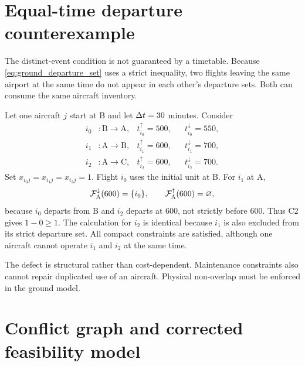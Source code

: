 \section{Equal-time departure counterexample}
\label{sec:ground_counterexample}

The distinct-event condition is not guaranteed by a timetable. Because
\eqref{eq:ground_departure_set} uses a strict inequality, two flights leaving
the same airport at the same time do not appear in each other's departure sets.
Both can consume the same aircraft inventory.

\begin{example}
    \label{ex:ground_simultaneous_departure}
    Let one aircraft $j$ start at B and let $\Delta t=30$ minutes. Consider
    \begin{align*}
        i_0 &: \text{B}\rightarrow\text{A},
            &t_{i_0}^{\uparrow}=500,&&t_{i_0}^{\downarrow}=550,\\
        i_1 &: \text{A}\rightarrow\text{B},
            &t_{i_1}^{\uparrow}=600,&&t_{i_1}^{\downarrow}=700,\\
        i_2 &: \text{A}\rightarrow\text{C},
            &t_{i_2}^{\uparrow}=600,&&t_{i_2}^{\downarrow}=700.
    \end{align*}
    Set $x_{i_0j}=x_{i_1j}=x_{i_2j}=1$. Flight $i_0$ uses the initial unit at B.
    For $i_1$ at A,
    \begin{equation*}
        \mathcal{F}_{\mathrm A}^{\downarrow}(600)=\{i_0\},\qquad
        \mathcal{F}_{\mathrm A}^{\uparrow}(600)=\varnothing,
    \end{equation*}
    because $i_0$ departs from B and $i_2$ departs at 600, not strictly before
    600. Thus C2 gives $1-0\geq1$. The calculation for $i_2$ is identical because
    $i_1$ is also excluded from its strict departure set. All compact constraints
    are satisfied, although one aircraft cannot operate $i_1$ and $i_2$ at the
    same time.
\end{example}

The defect is structural rather than cost-dependent. Maintenance constraints
also cannot repair duplicated use of an aircraft. Physical non-overlap must be
enforced in the ground model.

\section{Conflict graph and corrected feasibility model}

